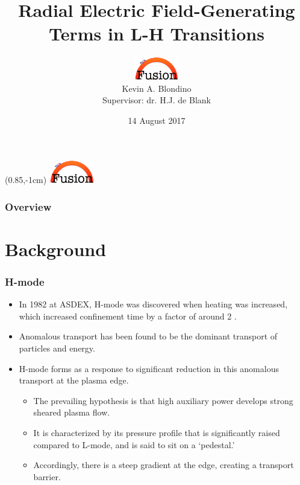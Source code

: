 \documentclass{beamer}
\title[$E_r$-Generating Terms in L-H Transitions]{Radial Electric Field-Generating Terms in L-H Transitions}
\author[K.A. Blondino]{\includegraphics[height=1cm]{../../Graphics/tue_fusion_logo.png} \\ Kevin A. Blondino \\
	Supervisor: dr. H.J. de Blank}
\institute[TU/e]{Eindhoven University of Technology \\
	\medskip
	\textit{k.blondino@student.tue.nl}}
\date{14 August 2017}
\begin{document}
\begin{frame}
\titlepage
\end{frame}

{
\begin{textblock*}{100mm}(0.85\textwidth,-1cm)
	\includegraphics[height=1cm,width=2cm]{../../Graphics/tue_fusion_logo.png}
\end{textblock*}
}

\begin{frame}
\frametitle{Overview}
\tableofcontents
\end{frame}


\section{Background}
\begin{frame}
\frametitle{H-mode}
\begin{itemize}
	\item In 1982 at ASDEX, H-mode was discovered when heating was increased, which increased confinement time by a factor of around 2 \cite{wagner_development_1984}.
	\item Anomalous transport has been found to be the dominant transport of particles and energy.
	\item H-mode forms as a response to significant reduction in this anomalous transport at the plasma edge.
	\begin{itemize}
		\item The prevailing hypothesis is that high auxiliary power develops strong sheared plasma flow.
		\item It is characterized by its pressure profile that is significantly raised compared to L-mode, and is said to sit on a `pedestal.'
		\item Accordingly, there is a steep gradient at the edge, creating a transport barrier.
	\end{itemize}
\end{itemize}
\end{frame}
\end{document}
